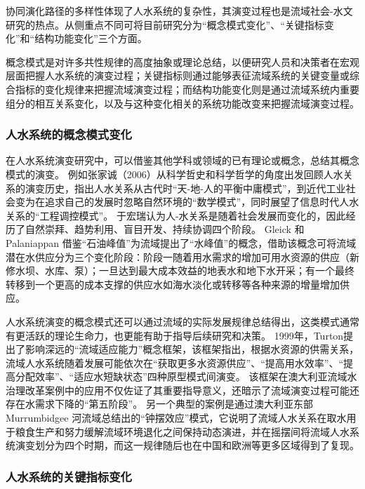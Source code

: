 协同演化路径的多样性体现了人水系统的复杂性，其演变过程也是流域社会-水文研究的热点。从侧重点不同可将目前研究分为“概念模式变化”、“关键指标变化”和“结构功能变化”三个方面。

概念模式是对许多共性规律的高度抽象或理论总结，以便研究人员和决策者在宏观层面把握人水系统的演变过程；关键指标则通过能够表征流域系统的关键变量或综合指标的变化规律来把握流域演变过程；而结构功能变化则是通过流域系统内重要组分的相互关系变化，以及与这种变化相关的系统功能改变来把握流域演变过程。

\subsubsection*{人水系统的概念模式变化}

在人水系统演变研究中，可以借鉴其他学科或领域的已有理论或概念，总结其概念模式的演变。
例如张家诚（2006）从科学哲史和科学哲学的角度出发回顾人水关系的演变历史，指出人水关系从古代时“天-地-人的平衡中庸模式”，到近代工业社会变为在追求自己的发展时忽略自然环境的“数学模式”，同时展望了信息时代人水关系的“工程调控模式”\cite{zhang2006}。
于宏瑞认为人-水关系是随着社会发展而变化的，因此经历了自然崇拜、趋势利用、盲目开发、持续协调四个阶段\cite{yuruihong2011}。
Gleick 和 Palaniappan 借鉴“石油峰值”为流域提出了“水峰值”的概念，借助该概念可将流域潜在水供应分为三个变化阶段：阶段一随着用水需求的增加可用水资源的供应（新修水坝、水库、泵）；一旦达到最大成本效益的地表水和地下水开采；有一个最终转移到一个更高的成本支撑的供应水如海水淡化或转移等各种来源的增量增加供应\cite{gleick2010}。

人水系统演变的概念模式还可以通过流域的实际发展规律总结得出，这类模式通常有更活跃的理论生命力，也更能有助于指导后续研究和决策。
1999年，Turton提出了影响深远的“流域适应能力”概念框架，该框架指出，根据水资源的供需关系，流域人水系统随着发展可能依次在“获取更多水资源供应”、“提高用水效率”、“提高分配效率”、“适应水短缺状态”四种原型模式间演变\cite{turton1999}。
该框架在澳大利亚流域水治理改革案例中的应用不仅佐证了其重要指导意义，还暗示了流域演变过程可能还存在水需求下降的“第五阶段”\cite{loch2020}。
另一个典型的案例是通过澳大利亚东部 Murrumbidgee 河流域总结出的“钟摆效应”模式，它说明了流域人水关系在取水用于粮食生产和努力缓解流域环境退化之间保持动态演进，并在摇摆间将流域人水系统演变划分为四个时期\cite{kandasamy2014, roobavannan2017}，而这一规律随后也在中国和欧洲等更多区域得到了复现\cite{han2017, mostert2018}。

\subsubsection*{人水系统的关键指标变化}

